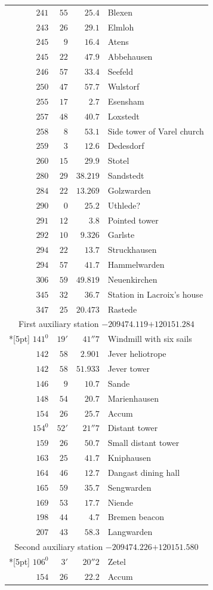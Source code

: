 \begin{longtable}{@{}rrrp{.61\linewidth}@{}}
\(241\)&\(55\)&\(25.4\)&\raggedright Blexen\tabularnewline
\(243\)&\(26\)&\(29.1\)&\raggedright Elmloh\tabularnewline
\(245\)&\(9\)&\(16.4\)&\raggedright Atens\tabularnewline
\(245\)&\(22\)&\(47.9\)&\raggedright Abbehausen\tabularnewline
\(246\)&\(57\)&\(33.4\)&\raggedright Seefeld\tabularnewline
\(250\)&\(47\)&\(57.7\)&\raggedright Wulstorf\tabularnewline
\(255\)&\(17\)&\(2.7\)&\raggedright Esensham\tabularnewline
\(257\)&\(48\)&\(40.7\)&\raggedright Loxstedt\tabularnewline
\(258\)&\(8\)&\(53.1\)&\raggedright Side tower of Varel church\tabularnewline
\(259\)&\(3\)&\(12.6\)&\raggedright Dedesdorf\tabularnewline
\(260\)&\(15\)&\(29.9\)&\raggedright Stotel\tabularnewline
\(280\)&\(29\)&\(38.219\)&\raggedright Sandstedt\tabularnewline
\(284\)&\(22\)&\(13.269\)&\raggedright Golzwarden\tabularnewline
\(290\)&\(0\)&\(25.2\)&\raggedright Uthlede?\tabularnewline
\(291\)&\(12\)&\(3.8\)&\raggedright Pointed tower\tabularnewline
\(292\)&\(10\)&\(9.326\)&\raggedright Garlste\tabularnewline
\(294\)&\(22\)&\(13.7\)&\raggedright Struckhausen\tabularnewline
\(294\)&\(57\)&\(41.7\)&\raggedright Hammelwarden\tabularnewline
\(306\)&\(59\)&\(49.819\)&\raggedright Neuenkirchen\tabularnewline
\(345\)&\(32\)&\(36.7\)&\raggedright Station in Lacroix’s house\tabularnewline
\(347\)&\(25\)&\(20.473\)&\raggedright Rastede\tabularnewline
\multicolumn{4}{c}{First auxiliary station \(-209474.119\)\qquad\(+120151.284\)}\\*[5pt]
\(141^{0}\)&\(19'\)&\(41''7\)&\raggedright Windmill with six sails\tabularnewline
\(142\)&\(58\)&\(2.901\)&\raggedright Jever heliotrope\tabularnewline
\(142\)&\(58\)&\(51.933\)&\raggedright Jever tower\tabularnewline
\(146\)&\(9\)&\(10.7\)&\raggedright Sande\tabularnewline
\(148\)&\(54\)&\(20.7\)&\raggedright Marienhausen\tabularnewline
\(154\)&\(26\)&\(25.7\)&\raggedright Accum\tabularnewline
\(154^{0}\)&\(52'\)&\(21''7\)&\raggedright Distant tower\tabularnewline
\(159\)&\(26\)&\(50.7\)&\raggedright Small distant tower\tabularnewline
\(163\)&\(25\)&\(41.7\)&\raggedright Kniphausen\tabularnewline
\(164\)&\(46\)&\(12.7\)&\raggedright Dangast dining hall\tabularnewline
\(165\)&\(59\)&\(35.7\)&\raggedright Sengwarden\tabularnewline
\(169\)&\(53\)&\(17.7\)&\raggedright Niende\tabularnewline
\(198\)&\(44\)&\(4.7\)&\raggedright Bremen beacon\tabularnewline
\(207\)&\(43\)&\(58.3\)&\raggedright Langwarden\tabularnewline
\multicolumn{4}{c}{Second auxiliary station \(-209474.226\)\qquad\(+120151.580\)}\\*[5pt]
\(106^{0}\)&\(3'\)&\(20''2\)&\raggedright Zetel\tabularnewline
\(154\)&\(26\)&\(22.2\)&\raggedright Accum\tabularnewline

\end{longtable}
